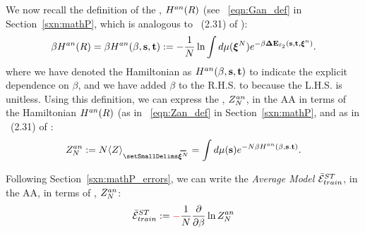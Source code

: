 We now recall the definition of the \AnnealedHamiltonian, $H^{an}(R)$ (see \EQN~\ref{eqn:Gan_def} in Section~\ref{sxn:mathP}, which is analogous to \EQN~(2.31) of \cite{SST92}):
\begin{align}
\label{eqn:Gan0}
\beta H^{an}(R) = \beta H^{an}(\beta,{\mathbf{s}},{\mathbf{t}}):=-\frac{1}{N}\ln \int d\mu(\boldsymbol{\xi}^{N})e^{-\beta\mathbf{\Delta {E}}_{\ell_2}({\mathbf{s}},{\mathbf{t}}, \boldsymbol{\xi}^{n})}  .
\end{align}
where we have denoted the Hamiltonian as $H^{an}(\beta,{\mathbf{s}},{\mathbf{t}})$ to indicate the explicit dependence on $\beta$,
and we have added $\beta$ to the R.H.S. to because the L.H.S. is unitless.
%
Using this definition, we can express the \Annealed \PartitionFunction, $Z^{an}_{N}$, in the AA in terms of the \Annealed Hamiltonian $H^{an}(R)$
(as in \EQN~\ref{eqn:Zan_def} in Section~\ref{sxn:mathP}, and as in \EQN~(2.31) of \cite{SST92}:
\begin{align}
 \label{eqn:Zan}
Z^{an}_{\ND}:=\ND\langle Z\rangle_{\AVGNDXI}=\int d\mu(\SVEC)e^{-\ND\beta\HAN(\beta,\SVEC.\TVEC)}  .
\end{align}

Following Section~\ref{sxn:mathP_errors}, we can write the \emph{Average Model \TrainingError} $\bar{\mathcal{E}}^{ST}_{train}$, in the AA,
in terms of \Annealed \PartitionFunction, $Z^{an}_{N}$:
\begin{align}
 \label{eqn:AVGSTTE_AA}
\bar{\mathcal{E}}^{ST}_{train}:= {\color{red}\sf{-}}\frac{1}{N}\dfrac{\partial }{\partial \beta} \ln Z^{an}_{N}
\end{align}

